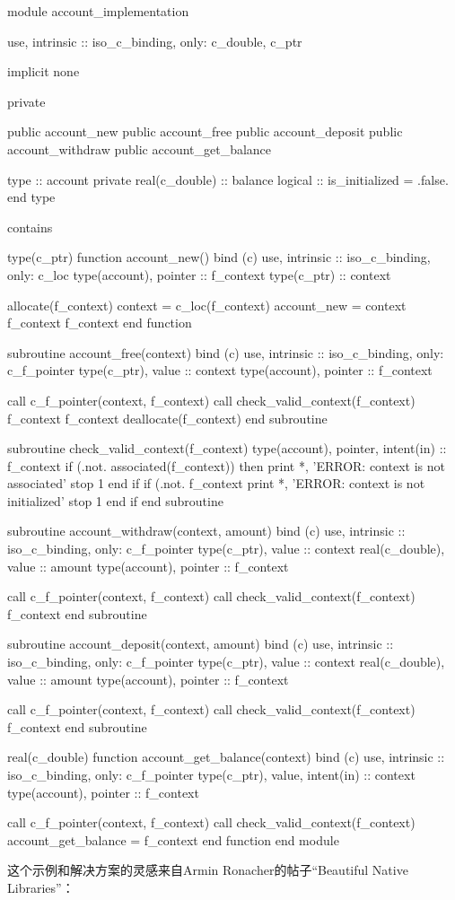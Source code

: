\begin{codebox}[fortran]
module account_implementation

  use, intrinsic :: iso_c_binding, only: c_double, c_ptr

  implicit none

  private

  public account_new
  public account_free
  public account_deposit
  public account_withdraw
  public account_get_balance

  type :: account
    private
    real(c_double) :: balance
    logical :: is_initialized = .false.
  end type

contains

  type(c_ptr) function account_new() bind (c)
    use, intrinsic :: iso_c_binding, only: c_loc
    type(account), pointer :: f_context
    type(c_ptr) :: context

    allocate(f_context)
    context = c_loc(f_context)
    account_new = context
    f_context%
    f_context%
  end function

  subroutine account_free(context) bind (c)
    use, intrinsic :: iso_c_binding, only: c_f_pointer
    type(c_ptr), value :: context
    type(account), pointer :: f_context

    call c_f_pointer(context, f_context)
    call check_valid_context(f_context)
    f_context%
    f_context%
    deallocate(f_context)
  end subroutine

  subroutine check_valid_context(f_context)
    type(account), pointer, intent(in) :: f_context
    if (.not. associated(f_context)) then
        print *, 'ERROR: context is not associated'
        stop 1
    end if
    if (.not. f_context%
        print *, 'ERROR: context is not initialized'
        stop 1
    end if
  end subroutine

  subroutine account_withdraw(context, amount) bind (c)
  use, intrinsic :: iso_c_binding, only: c_f_pointer
  type(c_ptr), value :: context
  real(c_double), value :: amount
  type(account), pointer :: f_context

  call c_f_pointer(context, f_context)
  call check_valid_context(f_context)
  f_context%
  end subroutine

  subroutine account_deposit(context, amount) bind (c)
    use, intrinsic :: iso_c_binding, only: c_f_pointer
    type(c_ptr), value :: context
    real(c_double), value :: amount
    type(account), pointer :: f_context

    call c_f_pointer(context, f_context)
    call check_valid_context(f_context)
    f_context%
  end subroutine

  real(c_double) function account_get_balance(context) bind (c)
    use, intrinsic :: iso_c_binding, only: c_f_pointer
    type(c_ptr), value, intent(in) :: context
    type(account), pointer :: f_context
    
    call c_f_pointer(context, f_context)
    call check_valid_context(f_context)
    account_get_balance = f_context%
  end function
end module
\end{codebox}

这个示例和解决方案的灵感来自Armin Ronacher的帖子“Beautiful Native Libraries”： 


